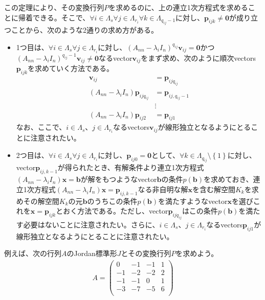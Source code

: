 \documentclass[dvipdfmx]{jsarticle}
\begin{document}
この定理により、その変換行列$P$を求めるのに、上の連立1次方程式を求めることに帰着できる。そこで、$\forall i \in \varLambda_{s}\forall j \in \varLambda_{r_{i}}\forall k \in \varLambda_{q_{ij} - 1}$に対し、$\mathbf{p}_{ijk} \neq \mathbf{0}$が成り立つことから、次のような2通りの求め方がある。
\begin{itemize}
\item
  1つ目は、$\forall i \in \varLambda_{s}\forall j \in \varLambda_{r_{i}}$に対し、$\left( A_{nn} - \lambda_{i}I_{n} \right)^{q_{ij}}\mathbf{v}_{ij} = \mathbf{0}$かつ$\left( A_{nn} - \lambda_{i}I_{n} \right)^{q_{ij} - 1}\mathbf{v}_{ij} \neq \mathbf{0}$なるvector$\mathbf{v}_{ij}$をまず求め、次のように順次vectors$\mathbf{p}_{ijk}$を求めていく方法である。
\begin{align*}
\mathbf{v}_{ij} &= \mathbf{p}_{ijq_{ij}}\\
\left( A_{nn} - \lambda_{i}I_{n} \right)\mathbf{p}_{ijq_{ij}} &= \mathbf{p}_{ij,q_{ij} - 1}\\
&\vdots \\
\left( A_{nn} - \lambda_{i}I_{n} \right)\mathbf{p}_{ij2} &= \mathbf{p}_{ij1}
\end{align*}
なお、ここで、$i \in \varLambda_{s}$、$j \in \varLambda_{r_{i}}$なるvectors$\mathbf{v}_{ij}$が線形独立となるようにとることに注意されたい。
\item
  2つ目は、$\forall i \in \varLambda_{s}\forall j \in \varLambda_{r_{i}}$に対し、$\mathbf{p}_{ij0} = \mathbf{0}$として、$\forall k \in \varLambda_{q_{ij}} \setminus \left\{ 1 \right\}$に対し、vector$\mathbf{p}_{ij,k - 1}$が得られたとき、有解条件より連立1次方程式$\left( A_{nn} - \lambda_{i}I_{n} \right)\mathbf{x} = \mathbf{b}$が解をもつようなvector$\mathbf{b}$の条件$p(\mathbf{b})$を求めておき、連立1次方程式$\left( A_{nn} - \lambda_{i}I_{n} \right)\mathbf{x} = \mathbf{p}_{ij,k - 1}$なる非自明な解$\mathbf{x}$を含む解空間$K_{k}$を求めその解空間$K_{k}$の元$\mathbf{b}$のうちこの条件$p\left( \mathbf{b} \right)$を満たすようなvector$\mathbf{x}$を選びこれを$\mathbf{x} = \mathbf{p}_{ijk}$とおく方法である。ただし、vector$\mathbf{p}_{ijq_{ij}}$はこの条件$p\left( \mathbf{b} \right)$を満たす必要はないことに注意されたい。さらに、$i \in \varLambda_{s}$、$j \in \varLambda_{r_{i}}$なるvectors$\mathbf{p}_{ij1}$が線形独立となるようにとることに注意されたい。
\end{itemize}\par
例えば、次の行列$A$のJordan標準形$J$とその変換行列$P$を求めよう。
\begin{align*}
A = \begin{pmatrix}
0 & - 1 & - 1 & 1 \\
 - 1 & - 2 & - 2 & 2 \\
 - 1 & - 1 & 0 & 1 \\
 - 3 & - 7 & - 5 & 6 \\
\end{pmatrix}
\end{align*}
\end{document}
